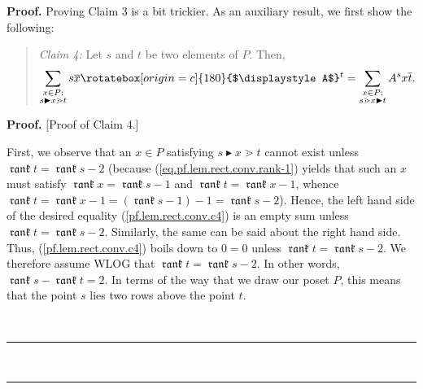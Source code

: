 \documentclass[numbers=enddot,12pt,final,onecolumn,notitlepage]{scrartcl}%
\theoremstyle{definition}
\newenvironment{vershort}{}{}
\newenvironment{statement}{\begin{quote}}{\end{quote}}
\newcommand{\upslack}{\mathchoice{\rotatebox[origin=c]{180}{$\displaystyle A$}}{\rotatebox[origin=c]{180}{$\textstyle A$}}{\rotatebox[origin=c]{180}{$\scriptstyle A$}}{\rotatebox[origin=c]{180}{$\scriptscriptstyle A$}}}
\newcommand{\downslack}{A}
\DeclareMathOperator{\rank}{\mathfrak{rank}}
\newenvironment{proof}[1][Proof]{\noindent\textbf{#1.} }{\ \rule{0.5em}{0.5em}}
\let\sumnonlimits\sum
\renewcommand{\sum}{\sumnonlimits\limits}
\begin{document}
\begin{proof}
Proving Claim 3 is a bit trickier. As an auxiliary result, we first show the following:

\begin{statement}
\textit{Claim 4:} Let $s$ and $t$ be two elements of $P$. Then,%
\begin{equation}
\sum_{\substack{x\in P;\\s\blacktriangleright x\gtrdot t}}s\overline
{x}\upslack^{t}=\sum_{\substack{x\in P;\\s\gtrdot x\blacktriangleright
t}}\downslack^{s}x\overline{t}. \label{pf.lem.rect.conv.c4}%
\end{equation}

\end{statement}

\begin{proof}
[Proof of Claim 4.]

\begin{vershort}
First, we observe that an $x\in P$ satisfying $s\blacktriangleright x\gtrdot
t$ cannot exist unless $\rank t=\rank s-2$ (because
(\ref{eq.pf.lem.rect.conv.rank-1}) yields that such an $x$ must satisfy
$\rank
x=\rank s-1$ and $\rank t=\rank x-1$, whence $\rank t=\rank x-1=\left(
\rank
s-1\right)  -1=\rank s-2$). Hence, the left hand side of the desired equality
(\ref{pf.lem.rect.conv.c4}) is an empty sum unless $\rank t=\rank s-2$.
Similarly, the same can be said about the right hand side. Thus,
(\ref{pf.lem.rect.conv.c4}) boils down to $0=0$ unless $\rank t=\rank s-2$. We
therefore assume WLOG that $\rank t=\rank s-2$. In other words,
$\rank s-\rank
t=2$. In terms of the way that we draw our poset $P$, this means that the
point $s$ lies two rows above the point $t$.
\end{vershort}


\end{proof}
\end{proof}
\end{document}
